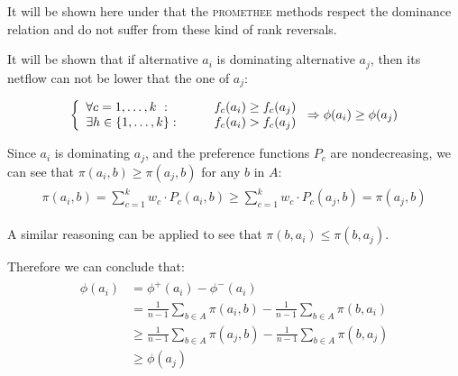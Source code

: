 It will be shown here under that the \textsc{promethee} methods respect the dominance relation \cite{DecisionEng} and do not suffer from these kind of rank reversals.

It will be shown that if alternative $a_i$ is dominating alternative $a_j$, then its netflow can not be lower that the one of $a_j$:

\begin{equation}
    \begin{split}
     \left \{
        \begin{array}{l l}
            \forall c=1,\dots, k \ :\qquad & f_c(a_i) \ge f_c(a_j) \\
            \exists h \in \{1,\dots,k\}: \qquad & f_c(a_i) > f_c(a_j)
        \end{array} \right .
        \Rightarrow \phi(a_i) \ge \phi(a_j)
    \end{split}
    \label{eqn:ai_dominates_aj}
\end{equation}

Since $a_i$ is dominating $a_j$, and the preference functions $P_c$ are nondecreasing, we can see that $\pi(a_i,b) \ge \pi(a_j,b)$ for any $b$ in $A$:
\begin{align}
    \begin{split}
        \pi(a_i, b) = \sum\limits^k_{c=1} w_c \cdot P_c(a_i,b)
                    \ge \sum\limits^k_{c=1} w_c \cdot P_c(a_j,b)
                    = \pi(a_j, b)
    \end{split}
    \label{eqn:pi_aib_ge_pi_ajb}
\end{align}

A similar reasoning can be applied to see that $\pi(b,a_i) \le \pi(b, a_j)$.

Therefore we can conclude that:
\begin{align}
    \begin{split}
    \phi(a_i) & = \phi^+(a_i) - \phi^-(a_i) \\
              & = \frac{1}{n-1}\sum\limits_{b\in A} \pi(a_i,b) - \frac{1}{n-1}\sum\limits_{b\in A} \pi(b, a_i)\\
              & \ge \frac{1}{n-1}\sum\limits_{b\in A} \pi(a_j,b) - \frac{1}{n-1}\sum\limits_{b\in A} \pi(b, a_j) \\
              & \ge \phi(a_j)
    \end{split}
    \label{eqn:dominance_demo_phi_ai}
\end{align}

